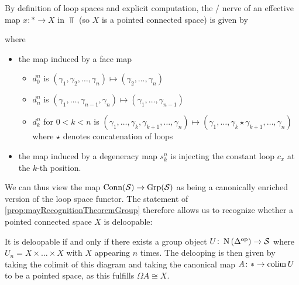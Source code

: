 \begin{remark}
    By definition of loop spaces and explicit computation, the \Cech/ nerve of an effective map $x\colon*\to X$ in $\Top$ (so $X$ is a pointed connected space) is given by %
    \begin{center}
    \end{center}
    where
    \begin{itemize}
        \item the map induced by a face map 
        \begin{itemize}
            \item $d_0^n$ is $(\gamma_1,\gamma_2,\ldots,\gamma_n)\mapsto(\gamma_2,\ldots,\gamma_n)$
            \item $d_n^n$ is $(\gamma_1,\ldots,\gamma_{n-1},\gamma_n)\mapsto(\gamma_1,\ldots,\gamma_{n-1})$
            \item $d_k^n$ for $0<k<n$ is $(\gamma_1,\ldots,\gamma_k,\gamma_{k+1},\ldots,\gamma_n)\mapsto(\gamma_1,\ldots,\gamma_k\star\gamma_{k+1},\ldots,\gamma_n)$ where $\star$ denotes concatenation of loops
        \end{itemize}
        \item the map induced by a degeneracy map $s_k^n$ is injecting the constant loop $c_x$ at the $k$-th position.
    \end{itemize}
    We can thus view the map $\operatorname{Conn}(\mathcal{S})\to\operatorname{Grp}(\mathcal{S})$ as being a canonically enriched version of the loop space functor.
    The statement of \cref{prop:mayRecognitionTheoremGroup} therefore allows us to recognize whether a pointed connected space $X$ is deloopable:

    It is deloopable if and only if there exists a group object $U\colon\operatorname{N}\left(\Delta^{\operatorname{op}}\right)\to\mathcal{S}$ %
    where $U_n= X\times\ldots\times X$ with $X$ appearing $n$ times.
    The delooping is then given by taking the colimit of this diagram and taking the canonical map $A\colon*\to\operatorname{colim} U$ to be a pointed space, as this fulfills $\Omega A\cong X$.
\end{remark}

